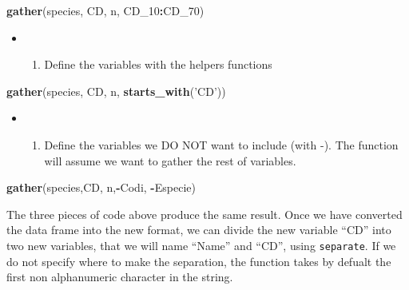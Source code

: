 \documentclass[]{article}
\newenvironment{Shaded}{\begin{snugshade}}{\end{snugshade}}
\newcommand{\KeywordTok}[1]{\textcolor[rgb]{0.13,0.29,0.53}{\textbf{#1}}}
\newcommand{\DecValTok}[1]{\textcolor[rgb]{0.00,0.00,0.81}{#1}}
\newcommand{\StringTok}[1]{\textcolor[rgb]{0.31,0.60,0.02}{#1}}
\newcommand{\OperatorTok}[1]{\textcolor[rgb]{0.81,0.36,0.00}{\textbf{#1}}}
\newcommand{\NormalTok}[1]{#1}
\providecommand{\tightlist}{%
  \setlength{\itemsep}{0pt}\setlength{\parskip}{0pt}}
\begin{document}
\begin{Shaded}
\begin{Highlighting}[]
    \KeywordTok{gather}\NormalTok{(species, CD, n, CD_}\DecValTok{10}\OperatorTok{:}\NormalTok{CD_}\DecValTok{70}\NormalTok{)}
\end{Highlighting}
\end{Shaded}

\begin{itemize}
\item
  \begin{enumerate}
  \def\labelenumi{(\Alph{enumi})}
  \setcounter{enumi}{2}
  \tightlist
  \item
    Define the variables with the helpers functions
  \end{enumerate}
\end{itemize}

\begin{Shaded}
\begin{Highlighting}[]
    \KeywordTok{gather}\NormalTok{(species, CD, n, }\KeywordTok{starts_with}\NormalTok{(}\StringTok{'CD'}\NormalTok{))}
\end{Highlighting}
\end{Shaded}

\begin{itemize}
\item
  \begin{enumerate}
  \def\labelenumi{(\Alph{enumi})}
  \setcounter{enumi}{3}
  \tightlist
  \item
    Define the variables we DO NOT want to include (with -). The
    function will assume we want to gather the rest of variables.
  \end{enumerate}
\end{itemize}

\begin{Shaded}
\begin{Highlighting}[]
     \KeywordTok{gather}\NormalTok{(species,CD, n,}\OperatorTok{-}\NormalTok{Codi, }\OperatorTok{-}\NormalTok{Especie)}
\end{Highlighting}
\end{Shaded}

The three pieces of code above produce the same result. Once we have
converted the data frame into the new format, we can divide the new
variable ``CD'' into two new variables, that we will name ``Name'' and
``CD'', using \texttt{separate}. If we do not specify where to make the
separation, the function takes by defualt the first non alphanumeric
character in the string.
\end{document}
